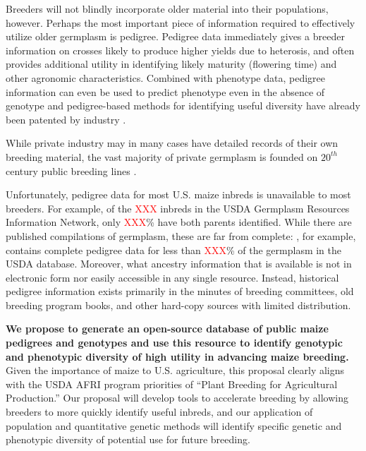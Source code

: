 \documentclass[12pt]{article}
\begin{document}
Breeders will not blindly incorporate older material into their populations, however.  
Perhaps the most important piece of information required to effectively utilize older germplasm is pedigree.
Pedigree data immediately gives a breeder information on crosses likely to produce higher yields due to heterosis, and often provides additional utility in identifying likely maturity (flowering time) and other agronomic characteristics. 
Combined with phenotype data, pedigree information can even be used to predict phenotype even in the absence of genotype \citep{piepho2008blup} and pedigree-based methods for identifying useful diversity have already been patented by industry \citep{sebastian1995method}.

While private industry may in many cases have detailed records of their own breeding material, the vast majority of private germplasm is founded on $20^{th}$ century public breeding lines \citep{nelson2008molecular}.

Unfortunately, pedigree data for most U.S. maize inbreds is unavailable to most breeders. 
For example, of the \textcolor{red}{XXX} inbreds in the USDA Germplasm Resources Information Network, only \textcolor{red}{XXX}\% have both parents identified. 
While there are published compilations of germplasm, these are far from complete:  \citet{gerdes1993compilation}, for example, contains complete pedigree data for less than \textcolor{red}{XXX}\% of the germplasm in the USDA database.
Moreover, what ancestry information that is available is not in electronic form nor easily accessible in any single resource.  
Instead, historical pedigree information exists primarily in the minutes of breeding committees, old breeding program books, and other hard-copy sources with limited distribution.  

{\bf We propose to  generate an open-source database of public maize pedigrees and genotypes and use this resource to identify genotypic and phenotypic diversity of high utility in advancing maize breeding.}
Given the importance of maize to U.S. agriculture, this proposal clearly aligns with the USDA AFRI program priorities of ``Plant Breeding for Agricultural Production.''  
Our proposal will develop tools to accelerate breeding by allowing breeders to more quickly identify useful inbreds, and our application of population and quantitative genetic methods will identify specific genetic and phenotypic diversity of potential use for future breeding.  
\end{document}
